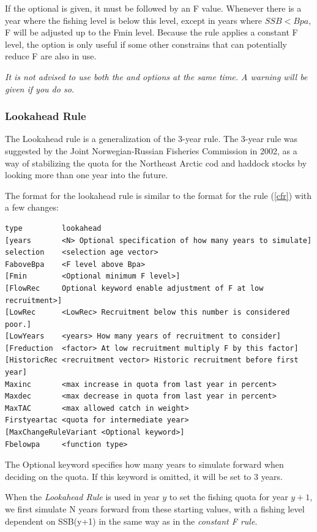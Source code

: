 \documentclass[12pt,twoside,a4paper]{article}
\begin{document}
If the optional  is given, it must be followed by an F value. Whenever there is a year where the fishing level is below this  level, except in years where $SSB < Bpa$, F will be adjusted up to the Fmin level. Because the
 rule applies a constant F level, the  option is only
useful if some other constrains that can potentially reduce F are also in use.

\emph{It is not advised to use both the  and  options at the same time.
A warning will be given if you do so.}

\subsubsection{Lookahead Rule}
\label{lookahead}

The Lookahead rule is a generalization of the 3-year rule. The 3-year rule was suggested 
by the Joint Norwegian-Russian Fisheries Commission in 2002,
as a way of stabilizing the quota for the Northeast Arctic cod and haddock stocks by looking
more than one year into the future. 

The format for the lookahead rule is similar to the format for the  rule (\ref{cfr}) with a few changes:
\begin{verbatim}
type         lookahead
[years       <N> Optional specification of how many years to simulate]
selection    <selection age vector>
FaboveBpa    <F level above Bpa>
[Fmin        <Optional minimum F level>]
[FlowRec     Optional keyword enable adjustment of F at low recruitment>]
[LowRec      <LowRec> Recruitment below this number is considered poor.]
[LowYears    <years> How many years of recruitment to consider]
[Freduction  <factor> At low recruitment multiply F by this factor]
[HistoricRec <recruitment vector> Historic recruitment before first year]
Maxinc       <max increase in quota from last year in percent>
Maxdec       <max decrease in quota from last year in percent>
MaxTAC       <max allowed catch in weight>
Firstyeartac <quota for intermediate year>
[MaxChangeRuleVariant <Optional keyword>]
Fbelowpa     <function type>
\end{verbatim}

The Optional keyword  specifies how many years to simulate forward when
deciding on the quota. If this keyword is omitted, it will be set to 3 years.

When the \emph{Lookahead Rule} is used in year $y$ to set the fishing quota for
year $y+1$, we first simulate N years forward from these starting values, with a
fishing level dependent on SSB(y+1) in the same way as in the \emph{constant F rule}. 
\end{document}
